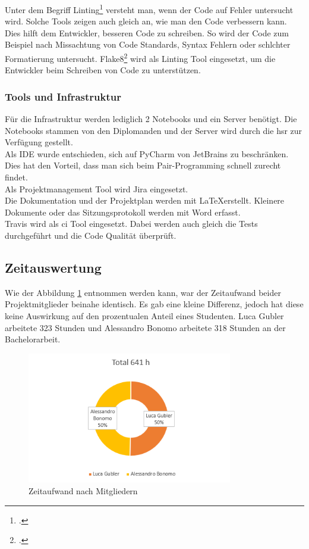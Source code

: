 Unter dem Begriff Linting\footcite{linting} versteht man, wenn der Code auf Fehler untersucht wird. Solche Tools zeigen auch gleich an, wie man den Code verbessern kann. Dies hilft dem Entwickler, besseren Code zu schreiben. So wird der Code zum Beispiel nach Missachtung von Code Standards, Syntax Fehlern oder schlchter Formatierung untersucht. Flake8\footcite{flake8} wird als Linting Tool eingesetzt, um die Entwickler beim Schreiben von Code zu unterstützen.

\subsubsection*{Tools und Infrastruktur}
Für die Infrastruktur werden lediglich 2 Notebooks und ein Server benötigt. Die Notebooks stammen von den Diplomanden und der Server wird durch die \gls{hsr} zur Verfügung gestellt. \\
Als IDE wurde entschieden, sich auf PyCharm von JetBrains zu beschränken. Dies hat den Vorteil, dass man sich beim Pair-Programming schnell zurecht findet. \\
Als Projektmanagement Tool wird Jira eingesetzt. \\
Die Dokumentation und der Projektplan werden mit \LaTeX erstellt. Kleinere Dokumente oder das Sitzungsprotokoll werden mit Word erfasst. \\
Travis wird als \gls{ci} Tool eingesetzt. Dabei werden auch gleich die Tests durchgeführt und die Code Qualität überprüft.



\newpage


\subsection{Zeitauswertung}
Wie der Abbildung \ref{time_per_student} entnommen werden kann, war der Zeitaufwand beider Projektmitglieder beinahe identisch. Es gab eine kleine Differenz, jedoch hat diese keine Auswirkung auf den prozentualen Anteil eines Studenten. Luca Gubler arbeitete 323 Stunden und Alessandro Bonomo arbeitete 318 Stunden an der Bachelorarbeit.

	\begin{figure}[H]
	\begin{center}
	
		\includegraphics[width=0.8\textwidth, height=\textheight, keepaspectratio]{images/Zeitauswertung/Arbeitsaufwand_Personen.png}
		\caption{Zeitaufwand nach Mitgliedern}
		\label{time_per_student}
		\end{center}
\end{figure}

